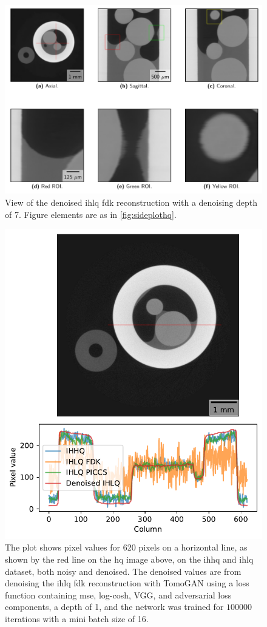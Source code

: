 \begin{figure}[htbp]
  \centering
  \includegraphics[width=.85\textwidth]{figures/kimrobertdepth7-x475y620s250.pdf}
  \caption[View of IHLQ FDK denoised with a depth of 7]{View of the denoised \gls{ihlq} \gls{fdk} reconstruction with a denoising depth of 7. Figure elements are as in \cref{fig:sideplothq}. }
  \label{fig:sideplotdepth7}
\end{figure}

\begin{figure}[htbp]
  \centering
  \includegraphics[width=.85\textwidth]{figures/kimrobertline.pdf}
  \caption[Pixel value plot of IHHQ and IHLQ, noisy and denoised]{The plot shows pixel values for 620 pixels on a horizontal line, as shown by the red line on the \gls{hq} image above, on the \gls{ihhq} and \gls{ihlq} dataset, both noisy and denoised. The denoised values are from denoising the \gls{ihlq} \gls{fdk} reconstruction with TomoGAN using a loss function containing \gls{mse}, log-cosh, VGG, and adversarial loss components, a depth of 1, and the network was trained for $100 000$ iterations with a mini batch size of 16. }
  \label{fig:kimrobertline}
\end{figure}

